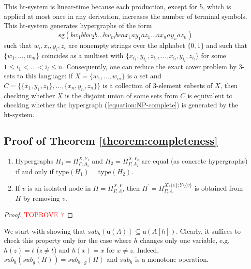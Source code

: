 \documentclass[a4paper,UKenglish,cleveref, autoref, thm-restate,pdfa]{lipics-v2021}
\newcommand{\type}{\mathrm{type}}
\newcommand{\SG}{\mathrm{sg}}
\newcommand{\sub}{\mathit{sub}}
\begin{document}
	This ht-system is linear-time because each production, except for 5, which is applied at most once in any derivation, increases the number of terminal symbols. This ht-system generates hypergraphs of the form
	\begin{equation}\label{equation:NP-complete}
		\SG(bw_1b bw_2b \ldots bw_m b c a x_1 a y_1 a z_1 \ldots a x_n a y_n a z_n)
	\end{equation}
	such that $w_i,x_i,y_i,z_i$ are nonempty strings over the alphabet $\{0,1\}$ and such that $\{w_1,\ldots,w_m\}$ coincides as a multiset with $\{x_{i_1},y_{i_1},z_{i_1},\ldots,x_{i_l},y_{i_l},z_{i_l}\}$ for some $1 \le i_1 < \ldots < i_l \le n$. Consequently, one can reduce the exact cover problem by 3-sets to this language: if $X=\{w_1,\ldots,w_{m}\}$ is a set and $C = \{\{x_1,y_1,z_1\},\ldots,\{x_n,y_n,z_n\}\}$ is a collection of 3-element subsets of $X$, then checking whether $X$ is the disjoint union of some sets from $C$ is equivalent to checking whether the hypergraph (\ref{equation:NP-complete}) is generated by the ht-system.

\subsection{Proof of Theorem \ref{theorem:completeness}}\label{appendix:proof-theorem:completeness}

\begin{lemma}\label{lemma:properties-HXYGA}
	\leavevmode
	\begin{enumerate}
		\item Hypergraphs $H_1 = H^{X;Y_1}_{\Gamma;A_1}$ and $H_2 = H^{X;Y_2}_{\Gamma;A_2}$ are equal (as concrete hypergraphs) if and only if $\type(H_1) = \type(H_2)$.
		\item If $v$ is an isolated node in $H = H^{X;Y}_{\Gamma;A}$, then $H^\prime = H^{X\setminus\{v\};Y\setminus\{v\}}_{\Gamma;A}$ is obtained from $H$ by removing $v$.
	\end{enumerate}
\end{lemma}
\begin{proof}\textcolor{red}{TOPROVE 7}\end{proof}

We start with showing that $\sub_h(\mathrm{u}(A)) \subseteq \mathrm{u}(A[h])$. Clearly, it suffices to check this property only for the case where $h$ changes only one variable, e.g. $h(z) = t$ ($z \ne t$) and $h(x)=x$ for $x \ne z$. Indeed, $\sub_h(\sub_g(H)) = \sub_{h \circ g}(H)$ and $\sub_h$ is a monotone operation.
\end{document}
